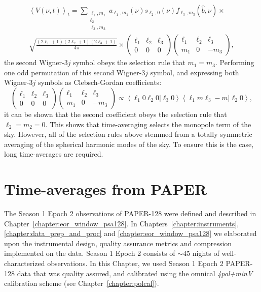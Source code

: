\begin{multline}
\left\langle V(\nu, t) \right\rangle_t = 
\sum_{\substack{\ell_1, m_1 \\ \ell_2 \\ \ell_3, m_3}} a_{\ell_1, m_1} (\nu) s_{\ell_2, 0} (\nu) f_{\ell_3, m_3} (\hat{b}, \nu) \times \\
\sqrt{\frac{(2\ell_1 + 1)(2\ell_2 + 1)(2\ell_3 + 1)}{4\pi}}
\times \begin{pmatrix}
\ell_1 & \ell_2 & \ell_3 \\
0 & 0 & 0
\end{pmatrix}
\begin{pmatrix}
\ell_1 & \ell_2 & \ell_3 \\
m_1 & 0 & -m_3
\end{pmatrix},
\end{multline}
the second Wigner-3$j$ symbol obeys the selection rule that $m_1 = m_3$. 
Performing one odd permutation of this second Wigner-3$j$ symbol, and expressing both Wigner-3$j$ symbols as Clebsch-Gordan coefficients:
\begin{equation}
\begin{pmatrix}
\ell_1 & \ell_2 & \ell_3 \\
0 & 0 & 0
\end{pmatrix}
\begin{pmatrix}
\ell_1 & \ell_2 & \ell_3 \\
m_1 & 0 & -m_3
\end{pmatrix}
\propto
\left\langle \ell_1 0 \ell_2 0 | \ell_3 0 \right\rangle \left\langle \ell_1 m \ell_3 -m | \ell_2 0 \right\rangle,
\end{equation}
it can be shown \citep[e.g.][]{Varshalovich.88} that the second coefficient obeys the selection rule that $\ell_2 = m_2 = 0$. This shows that time-averaging selects the monopole term of the sky. However, all of the selection rules above stemmed from a totally symmetric averaging of the spherical harmonic modes of the sky. To ensure this is the case, long time-averages are required.

\section{Time-averages from PAPER}

The Season 1 Epoch 2 observations of PAPER-128 were defined and described in Chapter~\ref{chapter:eor_window_psa128}. In Chapters~\ref{chapter:instruments}, \ref{chapter:data_prep_and_proc} and \ref{chapter:eor_window_psa128} we elaborated upon the instrumental design, quality assurance metrics and compression implemented on the data. Season 1 Epoch 2 consists of $\sim 45$ nights of well-characterized observations. In this Chapter, we used Season 1 Epoch 2 PAPER-128 data that was quality assured, and calibrated using the {\sc omnical} \citep{Zheng.14} \textit{4pol+minV} calibration scheme (see Chapter~\ref{chapter:polcal}). 

